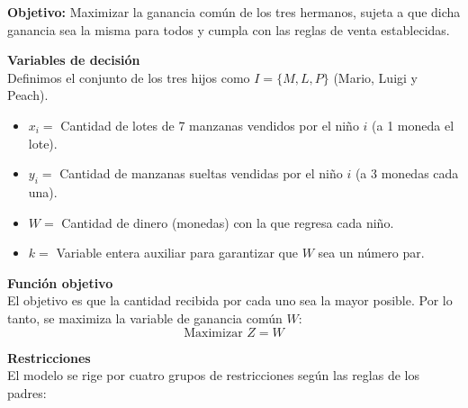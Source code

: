 \documentclass[10pt,a4paper]{article}
\begin{document}
\vspace{3mm}

\textbf{Objetivo:} Maximizar la ganancia común de los tres hermanos, sujeta a que dicha ganancia sea la misma para todos y cumpla con las reglas de venta establecidas.

\vspace{3mm}
\textbf{Variables de decisión}\\
Definimos el conjunto de los tres hijos como $I = \{M, L, P\}$ (Mario, Luigi y Peach).
\begin{itemize}
    \item $x_i = $ Cantidad de lotes de 7 manzanas vendidos por el niño $i$ (a 1 moneda el lote).
    \item $y_i = $ Cantidad de manzanas sueltas vendidas por el niño $i$ (a 3 monedas cada una).
    \item $W = $ Cantidad de dinero (monedas) con la que regresa cada niño.
    \item $k = $ Variable entera auxiliar para garantizar que $W$ sea un número par.
\end{itemize}

\vspace{3mm}
\textbf{Función objetivo}\\
El objetivo es que la cantidad recibida por cada uno sea la mayor posible. Por lo tanto, se maximiza la variable de ganancia común $W$:
\[ \text{Maximizar } Z = W \]

\vspace{3mm}
\textbf{Restricciones}\\
El modelo se rige por cuatro grupos de restricciones según las reglas de los padres:
\end{document}
